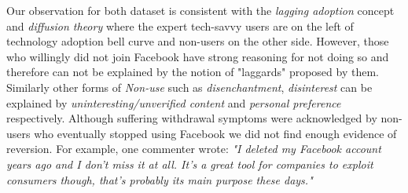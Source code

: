 Our observation for both dataset is consistent with the \textit{lagging adoption} concept \cite{satchell2009beyond} and \textit{diffusion theory} \cite{selwyn2003apart} where the expert tech-savvy users are on the left of technology adoption bell curve and non-users on the other side. However, those who willingly did not join Facebook have strong reasoning for not doing so and therefore can not be explained by the notion of "laggards" proposed by them. Similarly other forms of \emph{Non-use} such as \textit{disenchantment}, \textit{disinterest} can be explained by \textit{uninteresting/unverified content} and \textit{personal preference} respectively. Although suffering withdrawal symptoms \cite{baumer2015missing} were acknowledged by non-users who eventually stopped using Facebook we did not find enough evidence of reversion. For example, one commenter wrote: \textit{"I deleted my Facebook account years ago and I don't miss it at all. It's a great tool for companies to exploit consumers though, that's probably its main purpose these days."}
 

\begin{comment}


A closer look at the comments reveals predominant words like "social", "privacy", "fake", "ad", "data", "news", "personal", "security", "stopped", "deleted" which are associated with comment phrases like "social media", "privacy and security concerns", "fake news", "selling personal data", "stopped using", "deleted account" etc. It also contains sentiment terms, such as "shit", "fuck", "hate" etc. that reflect user aversion. The key terms in the bigram comments appear to be "fake news", "stop using", "news feed", "personal information", "privacy setting", "delete account". Most visible key phrases of trigram comments are: "i don't use", "i don't have", "don't use Facebook", "don't have a", "i don't care", "stop using Facebook". These visualizations are informative, for example, terms like "don't use Facebook" appeared 17 times which implies at least 17 times in a set of 516 comments users are talking about not using Facebook. All these gives us a top level idea of if people are rejecting Facebook and why. 

The interpretation of topics in the comments also supports our findings so far. Top words associated with each topic assumes the corpus is a mixture of these topics. For example "hate", "privacy", "news", "ads", "block", "data", "private", "privacy", "information", "stopped", "left", "dropped", "social", "personal", "deleted", "fake", "stop", "money", "problem" etc. The repetition of similar words indicates that the manual coding criteria adopted by the coders and future automated analysis tend to converge. This is exciting because that answers our \textit{RQ2} and it has practical implications for large scale analysis that will be discussed in Implications section.

\end{comment}

